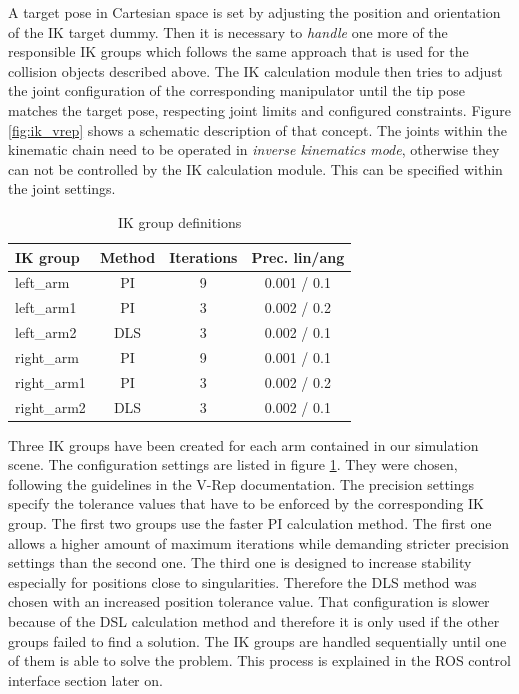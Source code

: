 A target pose in Cartesian space is set by adjusting the position and orientation of the IK target dummy. Then it is necessary to \emph{handle} one more of the responsible IK groups which follows the same approach that is used for the collision objects described above. The IK calculation module then tries to adjust the joint configuration of the corresponding manipulator until the tip pose matches the target pose, respecting joint limits and configured constraints. Figure \ref{fig:ik_vrep} shows a schematic description of that concept. The joints within the kinematic chain need to be operated in \emph{inverse kinematics mode}, otherwise they can not be controlled by the IK calculation module. This can be specified within the joint settings. \\

\begin{table}[h]
  \centering
  \begin{tabular}[h]{|l|c|c|c|} \hline
	\textbf{IK group} & \textbf{Method} & \textbf{Iterations} & \textbf{Prec. lin/ang} \\ \hline
	left\_arm & PI & 9 & 0.001 / 0.1  \\
	left\_arm1 & PI & 3 & 0.002 / 0.2  \\
	left\_arm2 & DLS & 3 & 0.002 / 0.1  \\
	right\_arm & PI & 9 & 0.001 / 0.1  \\
	right\_arm1 & PI & 3 & 0.002 / 0.2  \\
	right\_arm2 & DLS & 3 & 0.002 / 0.1  \\ \hline
  \end{tabular}
  \caption{IK group definitions}
  \label{fig:ik_defs}
\end{table}

Three IK groups have been created for each arm contained in our simulation scene. The configuration settings are listed in figure \ref{fig:ik_defs}. They were chosen, following the guidelines in the V-Rep documentation. The precision settings specify the tolerance values that have to be enforced by the corresponding IK group. The first two groups use the faster PI calculation method. The first one allows a higher amount of maximum iterations while demanding stricter precision settings than the second one. The third one is designed to increase stability especially for positions close to singularities. Therefore the DLS method was chosen with an increased position tolerance value. That configuration is slower because of the DSL calculation method and therefore it is only used if the other groups failed to find a solution. The IK groups are handled sequentially until one of them is able to solve the problem. This process is explained in the ROS control interface section later on.

